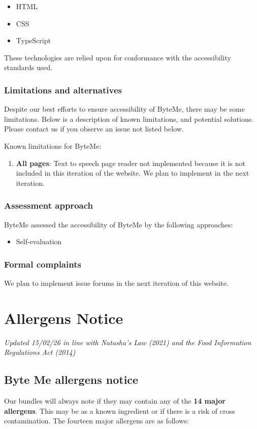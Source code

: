 \documentclass[11pt, a4paper]{report}
\begin{document}
\begin{itemize}
\begin{itemize}
	\item HTML
	\item CSS
	\item TypeScript
\end{itemize}

These technologies are relied upon for conformance with the accessibility standards used.

\subsection*{Limitations and alternatives}
Despite our best efforts to ensure accessibility of ByteMe, there may be some limitations. Below is a description of known limitations, and potential solutions. Please contact us if you observe an issue not listed below.

Known limitations for ByteMe:

\begin{enumerate}
	\item \textbf{All pages}: Text to speech page reader not implemented because it is not included in this iteration of the website. We plan to implement in the next iteration.
\end{enumerate}

\subsection*{Assessment approach}
ByteMe assessed the accessibility of ByteMe by the following approaches:

\begin{itemize}
	\item Self-evaluation
\end{itemize}

\subsection*{Formal complaints}
We plan to implement issue forums in the next iteration of this website.

\chapter{Allergens Notice}
\textit{Updated 15/02/26 in line with Natasha's Law (2021) and the Food Information Regulations Act (2014)}
\bigskip

\section*{Byte Me allergens notice}
Our bundles will always note if they may contain any of the \textbf{14 major allergens}. This may be as a known ingredient or if there is a risk of cross contamination. The fourteen major allergens are as follows:


\end{itemize}
\end{document}
